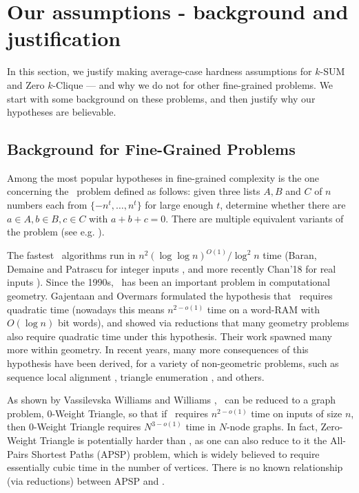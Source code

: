 \section{Our assumptions - background and justification}
\label{sec:justifyAssumptions}
In this section, we justify making average-case hardness assumptions for $k$-SUM and Zero $k$-Clique --- and why we do not for other fine-grained problems. We start with some background on these problems, and then justify why our hypotheses are believable.

\subsection{Background for Fine-Grained Problems}
Among the most popular hypotheses in fine-grained complexity is the one concerning the \ThSum~problem defined as follows: given three lists $A,B$ and $C$ of $n$ numbers each from $\{-n^t,\ldots,n^t\}$ for large enough $t$, determine whether there are $a\in A, b\in B, c\in C$ with $a+b+c=0$. There are multiple equivalent variants of the problem (see e.g. \cite{3sumIntroduction}).%

The fastest \ThSum~algorithms run in $n^2(\log\log n)^{O(1)}/\log^2 n$ time (Baran, Demaine and Patrascu for integer inputs \cite{BaranDP08}, and more recently Chan'18 for real inputs \cite{Chan18}). Since the 1990s, \ThSum~has been an important problem in computational geometry. Gajentaan and Overmars \cite{3sumIntroduction} formulated the hypothesis that \ThSum~requires quadratic time (nowadays this means
$n^{2-o(1)}$ time on a word-RAM with $O(\log n)$ bit words), and showed via reductions that many geometry problems also require quadratic time under this hypothesis. Their work spawned many more within geometry. In recent years, many more consequences of this hypothesis have been derived, for a variety of non-geometric problems, such as sequence local alignment \cite{abboud2014consequences}, triangle enumeration \cite{Patrascu10,KopelowitzPP16}, and others.

As shown by Vassilevska Williams and Williams \cite{virgi10}, \ThSum~can be reduced to a graph problem, 0-Weight Triangle, so that if \ThSum~requires $n^{2-o(1)}$ time on inputs of size $n$, then 0-Weight Triangle requires $N^{3-o(1)}$ time in $N$-node graphs. In fact, Zero-Weight Triangle is potentially harder than \ThSum, as one can also reduce to it the All-Pairs Shortest Paths (APSP) problem, which is widely believed to require essentially cubic time in the number of vertices. There is no known relationship (via reductions) between APSP and \ThSum.

